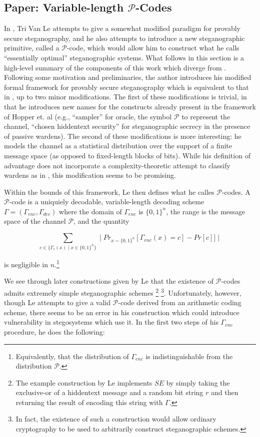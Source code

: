\documentclass{article}
\begin{document}
\subsection{Paper: Variable-length $\mathcal{P}$-Codes}

In \cite{BadSteg}, Tri Van Le attempts to give a somewhat modified paradigm for 
provably secure steganography, and he also attempts to introduce a new steganographic 
primitive, called a $\mathcal{P}$-code, which would allow him to construct 
what he calls ``essentially optimal'' steganographic systems.  What follows in this 
section is a high-level summary of the components of this work which diverge from \cite{BiglouPSS}.
\newline\newline
Following some motivation and preliminaries, the author introduces his modified formal 
framework for provably secure steganography which is equivalent to that in \cite{BiglouPSS}, up to two 
minor modifications.  The first of these modifications is trivial, in that he introduces 
new names for the constructs already present in the framework of Hopper et. al (e.g., 
``sampler'' for oracle, the symbol $\mathcal{P}$ to represent the channel, ``chosen hiddentext 
security'' for steganographic secrecy in the presence of passive wardens).  The second of these modifications is more interesting: he models the channel as a statistical distribution over the support of a finite message space
(as opposed to fixed-length blocks of bits).  While his definition of advantage does not incorporate a 
complexity-theoretic attempt to classify wardens as in \cite{BiglouPSS}, this modification seems to be promising.

Within the bounds of this framework, Le then defines what he calles $\mathcal{P}$-codes.  A $\mathcal{P}$-code is 
a uniquiely decodable, variable-length decoding scheme $\Gamma = (\Gamma_{enc}, \Gamma_{dec})$ where the domain of 
$\Gamma_{enc}$ is $\{0,1\}^n$, the range is the message space of the channel $\mathcal{P}$, 
and the quantity

\[ \sum_{c \in \{\Gamma_e(x) \mid x \in \{0,1\}^n \}} \mid Pr_{x \sim \{0,1\}^n}[\Gamma_{enc}(x) = c] - Pr[c] ] \mid \]

\noindent is negligible in $n$.\footnote{Equivalently, that the distribution of $\Gamma_{enc}$ is indistinguishable 
from the distribution $\mathcal{P}$.}

We see through later constructions given by Le that the existence of $\mathcal{P}$-codes admits extremely 
simple steganographic schemes \footnote{The example construction by Le implements $SE$ by simply taking the exclusive-or of a hiddentext message and a random bit string $r$ and then returning the result of encoding this string with $\Gamma$.}
 \footnote{In fact, the existence of such a construction would allow ordinary cryptography to be used to arbitrarily 
 construct steganographic schemes.}.  Unfortunately, however, though Le attempts to give a valid $\mathcal{P}$-code derived from an arithmetic coding scheme, 
 there seems to be an error in his construction which could introduce vulnerability in stegosystems which use it.  In the first two 
 steps of his $\Gamma_{enc}$ procedure, he does the following:
\end{document}
